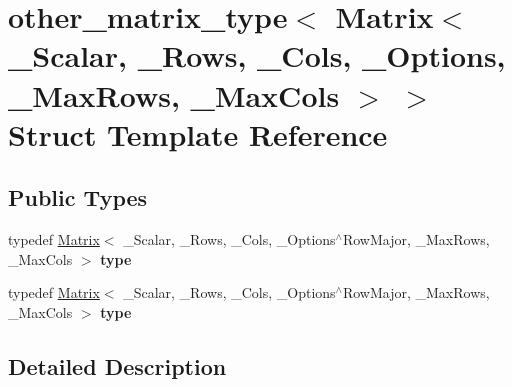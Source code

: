 \hypertarget{structother__matrix__type_3_01_matrix_3_01___scalar_00_01___rows_00_01___cols_00_01___options_00a4667fe800cd3729955b287c1d8a9c85}{}\section{other\+\_\+matrix\+\_\+type$<$ Matrix$<$ \+\_\+\+Scalar, \+\_\+\+Rows, \+\_\+\+Cols, \+\_\+\+Options, \+\_\+\+Max\+Rows, \+\_\+\+Max\+Cols $>$ $>$ Struct Template Reference}
\label{structother__matrix__type_3_01_matrix_3_01___scalar_00_01___rows_00_01___cols_00_01___options_00a4667fe800cd3729955b287c1d8a9c85}
\subsection*{Public Types}
\begin{DoxyCompactItemize}
\item 
\mbox{\label{structother__matrix__type_3_01_matrix_3_01___scalar_00_01___rows_00_01___cols_00_01___options_00a4667fe800cd3729955b287c1d8a9c85_ab4122294af91614a719ea919261dbd5e}} 
typedef \hyperlink{group___core___module_class_eigen_1_1_matrix}{Matrix}$<$ \+\_\+\+Scalar, \+\_\+\+Rows, \+\_\+\+Cols, \+\_\+\+Options$^\wedge$Row\+Major, \+\_\+\+Max\+Rows, \+\_\+\+Max\+Cols $>$ {\bfseries type}
\item 
\mbox{\label{structother__matrix__type_3_01_matrix_3_01___scalar_00_01___rows_00_01___cols_00_01___options_00a4667fe800cd3729955b287c1d8a9c85_ab4122294af91614a719ea919261dbd5e}} 
typedef \hyperlink{group___core___module_class_eigen_1_1_matrix}{Matrix}$<$ \+\_\+\+Scalar, \+\_\+\+Rows, \+\_\+\+Cols, \+\_\+\+Options$^\wedge$Row\+Major, \+\_\+\+Max\+Rows, \+\_\+\+Max\+Cols $>$ {\bfseries type}
\end{DoxyCompactItemize}


\subsection{Detailed Description}
